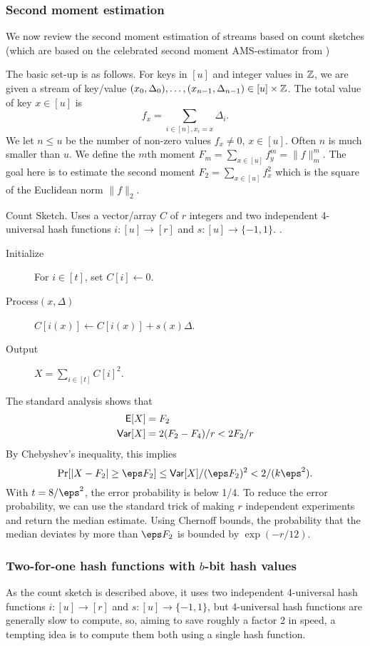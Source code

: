 \subsubsection{Second moment estimation}
We now review the second moment estimation of streams based on count
sketches \cite{charikar04count-sketch} (which are based on the
celebrated second moment AMS-estimator from \cite{alon96frequency})

The basic set-up is as follows.  For keys in $[u]$ and integer values in $\mathbb Z$, we are given a stream of key/value $(x_0,\Delta_0),\ldots, (x_{n-1},\Delta_{n-1})\in [u]\times\mathbb Z$. The
total value of key $x\in[u]$ is
\[f_x=\sum_{i\in[n],x_i=x} \Delta_i.\]
We let $n\leq u$ be  the number of non-zero values
$f_x\neq 0$, $x\in [u]$. Often $n$ is much smaller than $u$.
We define the $m$th moment
$F_m=\sum_{x\in [u]}f_y^m=\|f\|_m^m$. The goal here is to
estimate the second moment $F_2=\sum_{x\in [u]}f_x^2$ which is the square of the Euclidean norm $\|f\|_2$. 

\begin{algorithm}
   \caption{\label{alg:count-sketch} Count Sketch. Uses a
      vector/array $C$ of $r$ integers and two independent
      4-universal hash functions $i:[u]\to[r]$ and $s:[u]\to\{-1,1\}$.
   .}
   \begin{description}
      \item[Initialize] For $i\in[t]$, set $C[i]\gets 0$.
      \item[Process$(x,\Delta)$] $C[i(x)]\gets C[i(x)]+s(x) \Delta$. 
      \item[Output] $X=\sum_{i\in[t]} C[i]^2$.
   \end{description}
\end{algorithm}
The standard analysis \cite{charikar04count-sketch} shows that 
\begin{align}
   \operatorname*{\sf{E}}[X]&=F_2\label{eq:E-F2}\\
   {\sf Var}[X]&=2(F_2-F_4)/r<2F_2/r\label{eq:V-F2}
\end{align}
By Chebyshev's inequality, this implies
\[\Pr[|X-F_2|\geq \eps F_2]\leq \Var[X]/(\eps F_2)^2<
2/(k\eps^2).\]
With $t=8/\eps^2$, the error probability is below 1/4.
To
reduce the error probability, we can use the standard trick of
making $r$ independent experiments
and return the median estimate. Using Chernoff bounds, the probability
that the median deviates by more than $\eps F_2$ is bounded by
$\exp(-r/12)$.

\subsubsection{Two-for-one hash functions with $b$-bit hash values}
As the count sketch is described above,
it uses two independent 4-universal hash functions
$i:[u]\to[r]$ and $s:[u]\to\{-1,1\}$, but 4-universal hash functions
are generally slow to compute, so, aiming to save roughly a factor 2
in speed, a tempting idea is to compute them both using a single hash
function.

